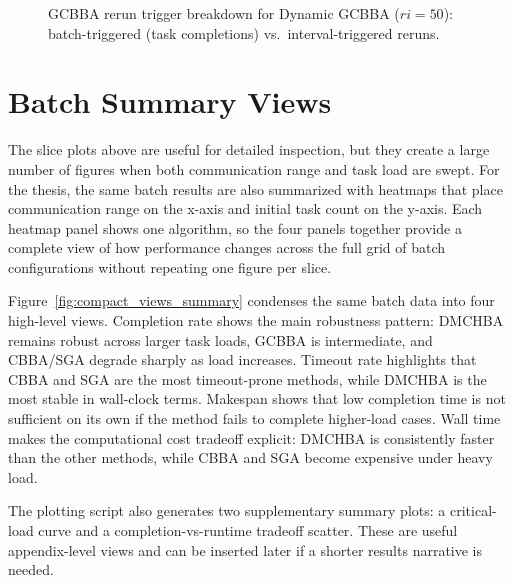 \begin{figure}[htbp]
  \centering
  \caption{GCBBA rerun trigger breakdown for Dynamic GCBBA
           ($ri = 50$): batch-triggered (task completions)
           vs.\ interval-triggered reruns.}
  \label{fig:trigger_breakdown}
\end{figure}


\section{Batch Summary Views}
\label{sec:exp_compact_views}

The slice plots above are useful for detailed inspection, but they
create a large number of figures when both communication range and
task load are swept. For the thesis, the same batch results are also
summarized with heatmaps that place communication range on the
x-axis and initial task count on the y-axis. Each heatmap panel shows
one algorithm, so the four panels together provide a complete view of
how performance changes across the full grid of batch configurations
without repeating one figure per slice.

Figure~\ref{fig:compact_views_summary} condenses the same batch data into
four high-level views. Completion rate shows the main robustness pattern:
DMCHBA remains robust across larger task loads, GCBBA is intermediate,
and CBBA/SGA degrade sharply as load increases. Timeout rate highlights
that CBBA and SGA are the most timeout-prone methods, while DMCHBA is the
most stable in wall-clock terms. Makespan shows that low completion time
is not sufficient on its own if the method fails to complete higher-load
cases. Wall time makes the computational cost tradeoff explicit:
DMCHBA is consistently faster than the other methods, while CBBA and SGA
become expensive under heavy load.

The plotting script also generates two supplementary summary plots: a
critical-load curve and a completion-vs-runtime tradeoff scatter. These
are useful appendix-level views and can be inserted later if a shorter
results narrative is needed.

